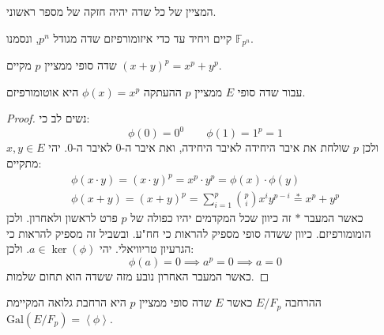 \documentclass{tstextbook}
\begin{document}
\begin{reminder}
המציין של כל שדה יהיה חזקה של מספר ראשוני.

\end{reminder}
\begin{proposition}
קיים ויחיד עד כדי איזומורפיזם שדה מגודל \(p^{n}\), ונסמנו \(\mathbb{F}_{p^{n}}\).

\end{proposition}
\begin{proposition}
שדה סופי ממציין \(p\) מקיים \((x+y)^{p}=x^{p}+y^{p}\).

\end{proposition}
\begin{proposition}
עבור שדה סופי \(E\) ממציין \(p\) ההעתקה \(\phi(x)=x^{p}\) היא אוטומורפיזם.

\end{proposition}
\begin{proof}
נשים לב כי:
$$\phi(0)=0^{0}\qquad \phi(1)=1^{p}=1$$
ולכן \(p\) שולחת את איבר היחידה לאיבר היחידה, ואת איבר ה-0 לאיבר ה-0. יהי \(x,y \in E\) מתקיים:
$$\begin{gather}\phi\left( x\cdot y \right)=\left( x\cdot y \right)^{p}=x^{p}\cdot y^{p}=\phi(x)\cdot \phi(y)  \\\phi(x+y)=(x+y)^{p}=\sum_{i=1}^{p} {p \choose i}x^{i}y^{p-i}\overset{*}{=} x^{p}+y^{p} 
\end{gather}$$
כאשר המעבר \(*\) זה כיוון שכל המקדמים יהיו כפולה של \(p\) פרט לראשון ולאחרון. ולכן הומומורפיזם. כיוון ששדה סופי מספיק להראות כי חח"ע. ובשביל זה מספיק להראות כי הגרעיון טריוויאלי. יהי \(a \in \ker\left( \phi \right)\). ולכן:
$$\phi(a)=0\implies a^{p}=0\implies a=0$$
כאשר המעבר האחרון נובע מזה ששדה הוא תחום שלמות.

\end{proof}
\begin{proposition}
ההרחבה \(E / F_{p}\) כאשר \(E\) שדה סופי ממציין \(p\) היא הרחבת גלואה המקיימת \(\mathrm{Gal}(E / F_{p})=\left\langle  \phi  \right\rangle\).

\end{proposition}
\end{document}
